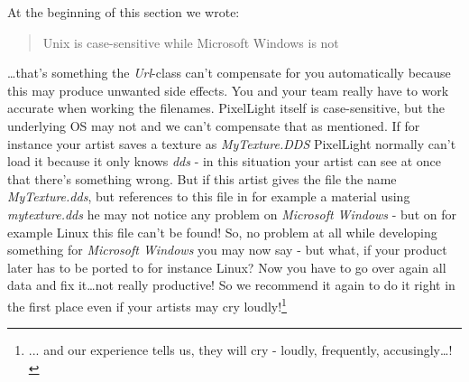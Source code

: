 At the beginning of this section we wrote: \begin{quote}Unix is case-sensitive while Microsoft Windows is not\end{quote}\ldots that's something the \emph{Url}-class can't compensate for you automatically because this may produce unwanted side effects. You and your team really have to work accurate when working the filenames. PixelLight itself is case-sensitive, but the underlying \ac{OS} may not and we can't compensate that as mentioned. If for instance your artist saves a texture as \emph{MyTexture.DDS} PixelLight normally can't load it because it only knows \emph{dds} - in this situation your artist can see at once that there's something wrong. But if this artist gives the file the name \emph{MyTexture.dds}, but references to this file in for example a material using \emph{mytexture.dds} he may not notice any problem on \emph{Microsoft Windows} - but on for example Linux this file can't be found! So, no problem at all while developing something for \emph{Microsoft Windows} you may now say - but what, if your product later has to be ported to for instance Linux? Now you have to go over again all data and fix it\ldots not really productive! So we recommend it again to do it right in the first place even if your artists may cry loudly!\footnote{... and our experience tells us, they will cry - loudly, frequently, accusingly\ldots !}
